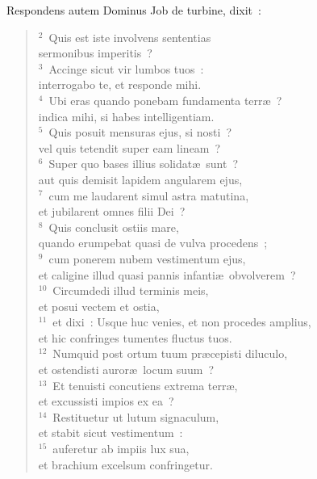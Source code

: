\lettrine[lines=10,image=true,loversize=0.05,lraise=-0.03]{R}{}espondens autem Dominus Job de turbine, dixit~:
\begin{flushleft}\begin{verse}\vspace{6pt}${}^{2}$~Quis est iste involvens sententias\\ sermonibus imperitis~?\\
${}^{3}$~Accinge sicut vir lumbos tuos~:\\ interrogabo te, et responde mihi.\\
${}^{4}$~Ubi eras quando ponebam fundamenta terr\ae~?\\ indica mihi, si habes intelligentiam.\\
${}^{5}$~Quis posuit mensuras ejus, si nosti~?\\ vel quis tetendit super eam lineam~?\\
${}^{6}$~Super quo bases illius solidat\ae\ sunt~?\\ aut quis demisit lapidem angularem ejus,\\
${}^{7}$~cum me laudarent simul astra matutina,\\ et jubilarent omnes filii Dei~?\\
${}^{8}$~Quis conclusit ostiis mare,\\ quando erumpebat quasi de vulva procedens~;\\
${}^{9}$~cum ponerem nubem vestimentum ejus,\\ et caligine illud quasi pannis infanti\ae\ obvolverem~?\\
${}^{10}$~Circumdedi illud terminis meis,\\ et posui vectem et ostia,\\
${}^{11}$~et dixi~: Usque huc venies, et non procedes amplius,\\ et hic confringes tumentes fluctus tuos.\\
${}^{12}$~Numquid post ortum tuum pr\ae cepisti diluculo,\\ et ostendisti auror\ae\ locum suum~?\\
${}^{13}$~Et tenuisti concutiens extrema terr\ae ,\\ et excussisti impios ex ea~?\\
${}^{14}$~Restituetur ut lutum signaculum,\\ et stabit sicut vestimentum~:\\
${}^{15}$~auferetur ab impiis lux sua,\\ et brachium excelsum confringetur.\\

\end{verse}
\end{flushleft}
